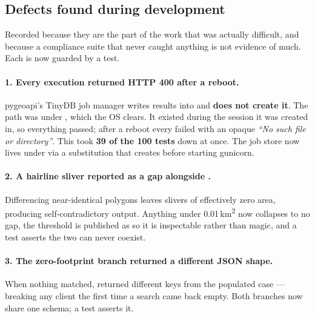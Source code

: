 \subsection{Defects found during development}
\label{sec:defects}

Recorded because they are the part of the work that was actually difficult, and
because a compliance suite that never caught anything is not evidence of much.
Each is now guarded by a test.

\paragraph{1. Every execution returned HTTP 400 after a reboot.} pygeoapi's
TinyDB job manager writes results into  and \textbf{does not
create it}. The path was under , which the OS clears. It existed
during the session it was created in, so everything passed; after a reboot every
 failed with an opaque \emph{``No such file or
directory''}. This took \textbf{39 of the 100 tests} down at once. The job store
now lives under  via a  substitution
that  creates before starting gunicorn.

\paragraph{2. A hairline sliver reported as a gap alongside
.} Differencing near-identical polygons leaves
slivers of effectively zero area, producing self-contradictory output. Anything
under 0.01\,km\textsuperscript{2} now collapses to no gap, the threshold is
published as  so it is inspectable rather than magic,
and a test asserts the two can never coexist.

\paragraph{3. The zero-footprint branch returned a different JSON shape.} When
nothing matched,  returned different keys from the populated
case --- breaking any client the first time a search came back empty. Both
branches now share one schema; a test asserts it.
